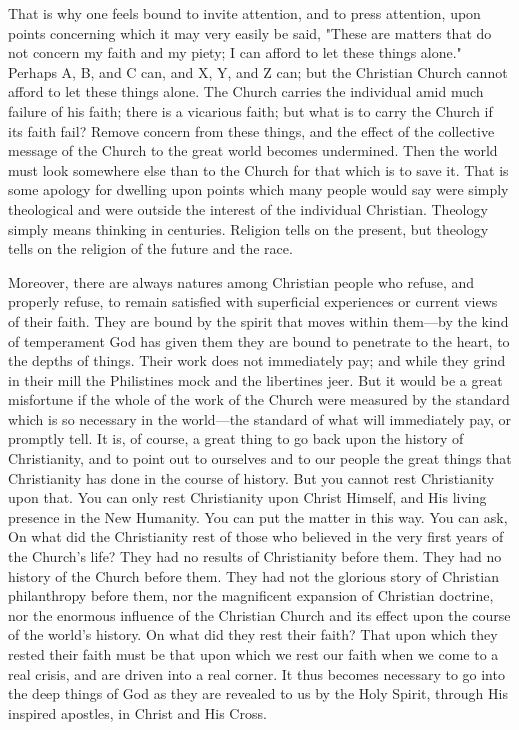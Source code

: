 \documentclass[draft]{ptfdoc}
\begin{document}
That is why one feels bound to invite attention, 
and to press attention, upon points concerning 
which it may very easily be said, "These 
are matters that do not concern my faith and 
my piety; I can afford to let these things alone." 
Perhaps A, B, and C can, and X, Y, and Z can; 
but the Christian Church cannot afford to let 
these things alone. The Church carries the 
individual amid much failure of his faith; 
there is a vicarious faith; but what is to 
carry the Church if its faith fail? Remove 
concern from these things, and the effect of 
the collective message of the Church to the 
great world becomes undermined. Then the 
world must look somewhere else than to the 
Church for that which is to save it. That is 
some apology for dwelling upon points which 
many people would say were simply theological 
and were outside the interest of the individual 
Christian. Theology simply means thinking in 
centuries. Religion tells on the present, but 
theology tells on the religion of the future 
and the race. 

Moreover, there are always natures among 
Christian people who refuse, and properly 
refuse, to remain satisfied with superficial 
experiences or current views of their faith. 
They are bound by the spirit that moves 
within them---by the kind of temperament God 
has given them they are bound to penetrate 
to the heart, to the depths of things. Their 
work does not immediately pay; and while they 
grind in their mill the Philistines mock and the 
libertines jeer. But it would be a great misfortune 
if the whole of the work of the Church 
were measured by the standard which is so 
necessary in the world---the standard of what 
will immediately pay, or promptly tell. It is, 
of course, a great thing to go back upon the 
history of Christianity, and to point out to ourselves 
and to our people the great things that 
Christianity has done in the course of history. 
But you cannot rest Christianity upon that. 
You can only rest Christianity upon Christ 
Himself, and His living presence in the New 
Humanity. You can put the matter in this 
way. You can ask, On what did the Christianity 
rest of those who believed in the very 
first years of the Church's life? They had no 
results of Christianity before them. They had 
no history of the Church before them. They 
had not the glorious story of Christian 
philanthropy before them, nor the magnificent 
expansion of Christian doctrine, nor the enormous
influence of the Christian Church and its 
effect upon the course of the world's history. 
On what did they rest their faith? That upon 
which they rested their faith must be that upon 
which we rest our faith when we come to a 
real crisis, and are driven into a real corner. 
It thus becomes necessary to go into the deep 
things of God as they are revealed to us by the 
Holy Spirit, through His inspired apostles, in 
Christ and His Cross. 
\end{document}
